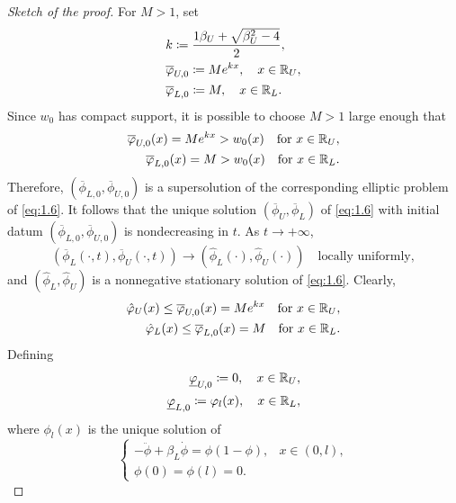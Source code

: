 \begin{proof}[Sketch of the proof]
    For \(M > 1\), set 
    \begin{align*}
        &k \coloneqq \frac{1\beta_U + \sqrt{\beta_U^2 - 4}}{2}, \\
        &\overline{\varphi}_{U,0} \coloneqq M e^{kx}, \quad x \in \mathbb{R}_U, \\
        &\overline{\varphi}_{L,0} \coloneqq M, \quad x \in \mathbb{R}_L.
    \end{align*}
    Since \(w_0\) has compact support, it is possible to choose \(M > 1\) large enough that
    \begin{align*}
        \overline{\varphi}_{U,0}(x) = M e^{kx} > w_0(x) \quad \text{for } x \in \mathbb{R}_U, \\
        \overline{\varphi}_{L,0}(x) = M > w_0(x) \quad \text{for } x \in \mathbb{R}_L. 
   \end{align*}
   Therefore, \((\overline{\phi}_{L,0}, \overline{\phi}_{U,0})\) is a supersolution of the corresponding elliptic problem of \eqref{eq:1.6}. It follows that the unique solution \((\overline{\phi}_U, \overline{\phi}_L)\) of \eqref{eq:1.6} with initial datum \((\overline{\phi}_{L,0}, \overline{\phi}_{U,0})\) is nondecreasing in \(t\).  As \(t \to +\infty\),
   \[
         (\overline{\phi}_L(\cdot, t), \overline{\phi}_U(\cdot, t)) \to (\hat{\phi}_L(\cdot), \hat{\phi}_U(\cdot)) \quad \text{locally uniformly},
   \]
   and \((\hat{\phi}_L, \hat{\phi}_U)\) is a nonnegative stationary solution of \eqref{eq:1.6}. Clearly,
   \begin{align*}
    \hat{\varphi}_U(x) \leq \overline{\varphi}_{U,0}(x) = M e^{kx} \quad \text{for } x \in \mathbb{R}_U, \\
    \hat{\varphi}_L(x) \leq \overline{\varphi}_{L,0}(x) = M \quad \text{for } x \in \mathbb{R}_L.
   \end{align*}
   Defining 
   \begin{align*}
         \underline{\varphi}_{U,0} \coloneqq 0, \quad x \in \mathbb{R}_U, \\
            \underline{\varphi}_{L,0} \coloneqq \varphi_l(x), \quad x \in \mathbb{R}_L,
   \end{align*}
   where \(\phi_l(x)\) is the unique solution of
   \begin{equation*}
    \begin{cases}
        -\ddot{\phi} + \beta_L \dot{\phi} = \phi(1 - \phi), & x \in (0, l), \\
        \phi(0) = \phi(l) = 0.
    \end{cases}
   \end{equation*}

\end{proof}
